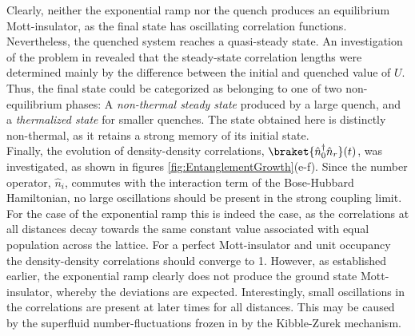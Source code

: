 Clearly, neither the exponential ramp nor the quench produces an equilibrium Mott-insulator, as the final state has oscillating correlation functions. Nevertheless, the quenched system reaches a quasi-steady state. An investigation of the problem in \cite{Kollath2007} revealed that the steady-state correlation lengths were determined mainly by the difference between the initial and quenched value of $U$. Thus, the final state could be categorized as belonging to one of two non-equilibrium phases: A \textit{non-thermal steady state} produced by a large quench, and a \textit{thermalized state} for smaller quenches. The state obtained here is distinctly non-thermal, as it retains a strong memory of its initial state.\\

Finally, the evolution of density-density correlations, $\braket{\hat{n}_{0}^{\dag} \hat{n}_{r}}(t)$, was investigated, as shown in figures \ref{fig:EntanglementGrowth}(e-f). Since the number operator, $\hat{n}_i$, commutes with the interaction term of the Bose-Hubbard Hamiltonian, no large oscillations should be present in the strong coupling limit. For the case of the exponential ramp this is indeed the case, as the correlations at all distances decay towards the same constant value associated with equal population across the lattice. For a perfect Mott-insulator and unit occupancy the density-density correlations should converge to 1. However, as established earlier, the exponential ramp clearly does not produce the ground state Mott-insulator, whereby the deviations are expected. Interestingly, small oscillations in the correlations are present at later times for all distances. This may be caused by the superfluid number-fluctuations frozen in by the Kibble-Zurek mechanism.

